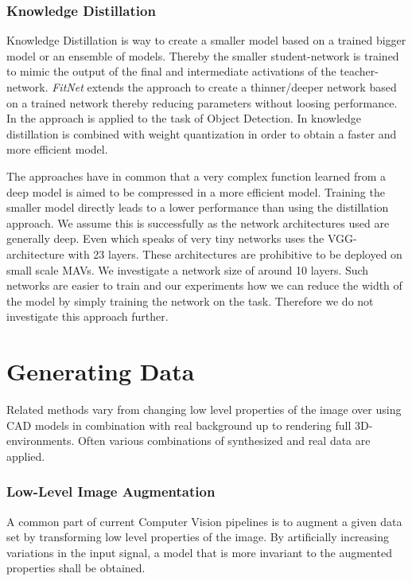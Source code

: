 \subsubsection{Knowledge Distillation}

Knowledge Distillation \cite{Hinton2006} is way to create a smaller model based on a trained bigger model or an ensemble of models. Thereby the smaller student-network is trained to mimic the output of the final and intermediate activations of the teacher-network. \textit{FitNet} extends the approach to create a thinner/deeper network based on a trained network thereby reducing parameters without loosing performance. In \cite{Li2017c} the approach is applied to the task of Object Detection. In \cite{Wei2018a} knowledge distillation is combined with weight quantization in order to obtain a faster and more efficient model.

The approaches have in common that a very complex function learned from a deep model is aimed to be compressed in a more efficient model. Training the smaller model directly leads to a lower performance than using the distillation approach. We assume this is successfully as the network architectures used are generally deep. Even \cite{Wei2018a} which speaks of very tiny networks uses the VGG-architecture with 23 layers. These architectures are prohibitive to be deployed on small scale \acp{MAV}. We investigate a network size of around 10 layers. Such networks are easier to train and our experiments how we can reduce the width of the model by simply training the network on the task. Therefore we do not investigate this approach further.

\section{Generating Data}
\label{sec:training:related}

Related methods vary from changing low level properties of the image over using CAD models in combination with real background up to rendering full 3D-environments. Often various combinations of synthesized and real data are applied. 

\subsubsection{Low-Level Image Augmentation}

A common part of current Computer Vision pipelines is to augment a given data set by transforming low level properties of the image. By artificially increasing variations in the input signal, a model that is more invariant to the augmented properties shall be obtained.

